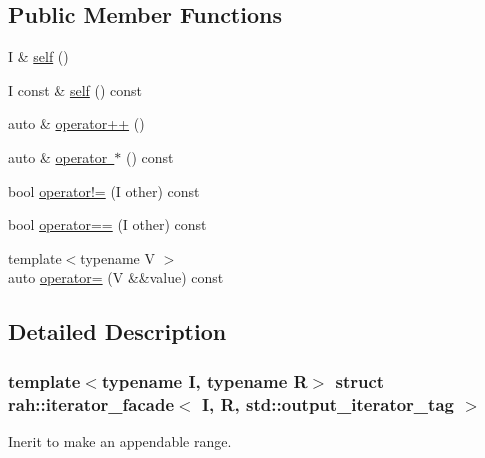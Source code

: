 \subsection*{Public Member Functions}
\begin{DoxyCompactItemize}
\item 
I \& \mbox{\hyperlink{structrah_1_1iterator__facade_3_01_i_00_01_r_00_01std_1_1output__iterator__tag_01_4_a9602e6a110edd67b6ea4a1894f88be01}{self}} ()
\item 
I const  \& \mbox{\hyperlink{structrah_1_1iterator__facade_3_01_i_00_01_r_00_01std_1_1output__iterator__tag_01_4_affe2cc30de7c9e5ea2f5f11e70fe24af}{self}} () const
\item 
auto \& \mbox{\hyperlink{structrah_1_1iterator__facade_3_01_i_00_01_r_00_01std_1_1output__iterator__tag_01_4_a25875a0ae0f0c22b7ff5f25d97a04724}{operator++}} ()
\item 
auto \& \mbox{\hyperlink{structrah_1_1iterator__facade_3_01_i_00_01_r_00_01std_1_1output__iterator__tag_01_4_a7c68323dc18e20b6f946223ee54d88c8}{operator $\ast$}} () const
\item 
bool \mbox{\hyperlink{structrah_1_1iterator__facade_3_01_i_00_01_r_00_01std_1_1output__iterator__tag_01_4_a3c3fc4b28b04fade22ea33a8c14f2771}{operator!=}} (I other) const
\item 
bool \mbox{\hyperlink{structrah_1_1iterator__facade_3_01_i_00_01_r_00_01std_1_1output__iterator__tag_01_4_a7ddab65a78bdd6b9fec8f4d122fbf731}{operator==}} (I other) const
\item 
{\footnotesize template$<$typename V $>$ }\\auto \mbox{\hyperlink{structrah_1_1iterator__facade_3_01_i_00_01_r_00_01std_1_1output__iterator__tag_01_4_aa5052339259412e552022ef533c31c67}{operator=}} (V \&\&value) const
\end{DoxyCompactItemize}


\subsection{Detailed Description}
\subsubsection*{template$<$typename I, typename R$>$\newline
struct rah\+::iterator\+\_\+facade$<$ I, R, std\+::output\+\_\+iterator\+\_\+tag $>$}

Inerit to make an appendable range. 


